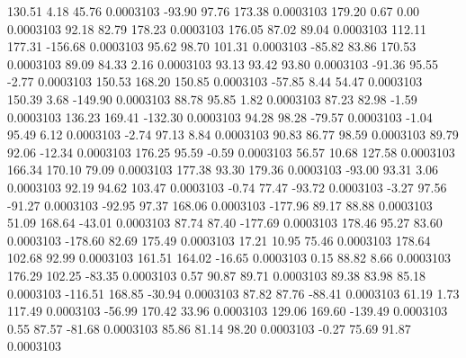       130.51        4.18       45.76     0.0003103
      -93.90       97.76      173.38     0.0003103
      179.20        0.67        0.00     0.0003103
       92.18       82.79      178.23     0.0003103
      176.05       87.02       89.04     0.0003103
      112.11      177.31     -156.68     0.0003103
       95.62       98.70      101.31     0.0003103
      -85.82       83.86      170.53     0.0003103
       89.09       84.33        2.16     0.0003103
       93.13       93.42       93.80     0.0003103
      -91.36       95.55       -2.77     0.0003103
      150.53      168.20      150.85     0.0003103
      -57.85        8.44       54.47     0.0003103
      150.39        3.68     -149.90     0.0003103
       88.78       95.85        1.82     0.0003103
       87.23       82.98       -1.59     0.0003103
      136.23      169.41     -132.30     0.0003103
       94.28       98.28      -79.57     0.0003103
       -1.04       95.49        6.12     0.0003103
       -2.74       97.13        8.84     0.0003103
       90.83       86.77       98.59     0.0003103
       89.79       92.06      -12.34     0.0003103
      176.25       95.59       -0.59     0.0003103
       56.57       10.68      127.58     0.0003103
      166.34      170.10       79.09     0.0003103
      177.38       93.30      179.36     0.0003103
      -93.00       93.31        3.06     0.0003103
       92.19       94.62      103.47     0.0003103
       -0.74       77.47      -93.72     0.0003103
       -3.27       97.56      -91.27     0.0003103
      -92.95       97.37      168.06     0.0003103
     -177.96       89.17       88.88     0.0003103
       51.09      168.64      -43.01     0.0003103
       87.74       87.40     -177.69     0.0003103
      178.46       95.27       83.60     0.0003103
     -178.60       82.69      175.49     0.0003103
       17.21       10.95       75.46     0.0003103
      178.64      102.68       92.99     0.0003103
      161.51      164.02      -16.65     0.0003103
        0.15       88.82        8.66     0.0003103
      176.29      102.25      -83.35     0.0003103
        0.57       90.87       89.71     0.0003103
       89.38       83.98       85.18     0.0003103
     -116.51      168.85      -30.94     0.0003103
       87.82       87.76      -88.41     0.0003103
       61.19        1.73      117.49     0.0003103
      -56.99      170.42       33.96     0.0003103
      129.06      169.60     -139.49     0.0003103
        0.55       87.57      -81.68     0.0003103
       85.86       81.14       98.20     0.0003103
       -0.27       75.69       91.87     0.0003103
